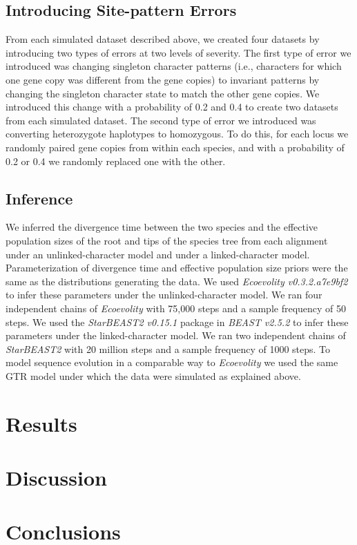 \subsection{Introducing Site-pattern Errors}
From each simulated dataset described above, we created four datasets by 
introducing two types of errors at two levels of severity. The first type of 
error we introduced was changing singleton character patterns (i.e., characters 
for which one gene copy was different from the gene copies) to invariant 
patterns by changing the singleton character state to match the other gene 
copies. We introduced this change with a probability of 0.2 and 0.4 to create 
two datasets from each simulated dataset. The second type of error we introduced 
was converting heterozygote haplotypes to homozygous. To do this, for each locus 
we randomly paired gene copies from within each species, and with a probability 
of 0.2 or 0.4 we randomly replaced one with the other. 

\subsection{Inference}
We inferred the divergence time between the two species and the effective 
population sizes of the root and tips of the species tree from each alignment 
under an unlinked-character model and under a linked-character model.
Parameterization of divergence time and effective population size priors were 
the same as the distributions generating the data.
We used \textit{Ecoevolity v0.3.2.a7e9bf2} to infer these parameters under the 
unlinked-character model. We ran four independent chains of \textit{Ecoevolity} 
with 75,000 steps and a sample frequency of 50 steps.
We used the \textit{StarBEAST2 v0.15.1} package in \textit{BEAST v2.5.2} to 
infer these parameters under the linked-character model. 
We ran two independent chains of \textit{StarBEAST2} with 20 million steps and a 
sample frequency of 1000 steps. 
To model sequence evolution in a comparable way to \textit{Ecoevolity} we used 
the same GTR model under which the data were simulated as explained above.

\section{Results}


\section{Discussion}


\section{Conclusions}
